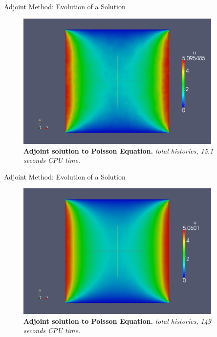 \documentclass{beamer}
\begin{document}
\begin{frame}{Adjoint Method: Evolution of a Solution}

  \begin{figure}[h!]
    \begin{center}
      \includegraphics[width=4in]{adjoint_1000000.png}
    \end{center}
    \caption{\textbf{Adjoint solution to Poisson Equation.}
      \textit{ total histories, 15.1 seconds CPU time.} }
  \end{figure}

\end{frame}

\begin{frame}{Adjoint Method: Evolution of a Solution}

  \begin{figure}[h!]
    \begin{center}
      \includegraphics[width=4in]{adjoint_10000000.png}
    \end{center}
    \caption{\textbf{Adjoint solution to Poisson Equation.}
      \textit{ total histories, 149 seconds CPU time.} }
  \end{figure}

\end{frame}
\end{document}
